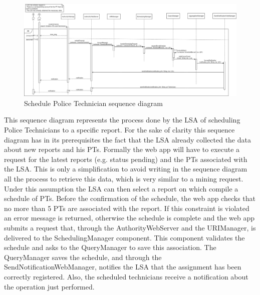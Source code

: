 \begin{figure}[H]
  \centering
  \includegraphics[width=1\textwidth]{Images/UML_diagrams/Sequence_Diagrams/Schedule_PT_sd.png}
  \caption{Schedule Police Technician sequence diagram}
  \label{fig:schedule_PT_sd}
\end{figure}
This sequence diagram represents the process done by the LSA of scheduling Police Technicians to a specific report. For the sake of clarity this sequence diagram has in its prerequisites the fact that the LSA already collected the data about new reports and his PTs. Formally the web app will have to execute a request for the latest reports (e.g. status pending) and the PTs associated with the LSA. This is only a simplification to avoid writing in the sequence diagram all the process to retrieve this data, which is very similar to a mining request. Under this assumption the LSA can then select a report on which compile a schedule of PTs. Before the confirmation of the schedule, the web app checks that no more than 5 PTs are associated with the report. If this constraint is violated an error message is returned, otherwise the schedule is complete and the web app submits a request that, through the AuthorityWebServer and the URIManager, is delivered to the SchedulingManager component. This component validates the schedule and asks to the QueryManager to save this association. The QueryManager saves the schedule, and through the SendNotificationWebManager, notifies the LSA that the assignment has been correctly registered. Also, the scheduled technicians receive a notification about the operation just performed.
